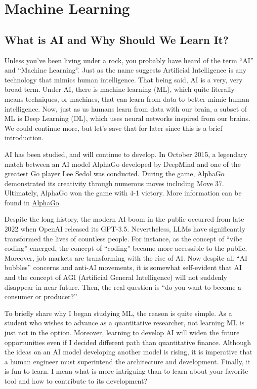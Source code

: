 \documentclass[../../main.tex]{subfiles}
\begin{document}
\part{Machine Learning}\label{part:CS01}
\localtableofcontents

\chapter*{What is AI and Why Should We Learn It?}

Unless you've been living under a rock, you probably have heard of
the term ``AI'' and ``Machine Learning''. Just as the name suggests
Artificial Intelligence is any technology that mimics human
intelligence. That being said, AI is a very, very broad term.
Under AI, there is machine learning (ML), which quite literally
means techniques, or machines, that can learn from data to better
mimic human intelligence. Now, just as us humans learn from data
with our brain, a subset of ML is Deep Learning (DL), which uses
neural networks inspired from our brains. We could continue more,
but let's save that for later since this is a brief introduction.

AI has been studied, and will continue to develop. In October 2015,
a legendary match between an AI model AlphaGo developed by DeepMind
and one of the greatest Go player Lee Sedol was conducted. During
the game, AlphaGo demonstrated its creativity through numerous
moves including Move 37. Ultimately, AlphaGo won the game with
4-1 victory. More information can be found in
\href{https://deepmind.google/research/alphago/}{AlphaGo}.

Despite the long history, the modern AI boom in the public
occurred from late 2022 when OpenAI released its GPT-3.5.
Nevertheless, LLMs have significantly transformed the lives of
countless people. For instance, as the concept of ``vibe coding''
emerged, the concept of ``coding'' became more accessible to the
public. Moreover, job markets are transforming with the rise of
AI. Now despite all ``AI bubbles'' concerns and anti-AI movements,
it is somewhat self-evident that AI and the concept of AGI
(Artificial General Intelligence) will not suddenly disappear
in near future. Then, the real question is ``do you want to
become a consumer or producer?''

To briefly share why I began studying ML, the reason is quite
simple. As a student who wishes to advance as a quantitative
researcher, not learning ML is just not in the option. Moreover,
learning to develop AI will widen the future opportunities even
if I decided different path than quantitative finance. Although
the ideas on an AI model developing another model is rising,
it is imperative that a human engineer must superintend the
architecture and development. Finally, it is fun to learn.
I mean what is more intriguing than to learn about your favorite
tool and how to contribute to its development?
\end{document}
